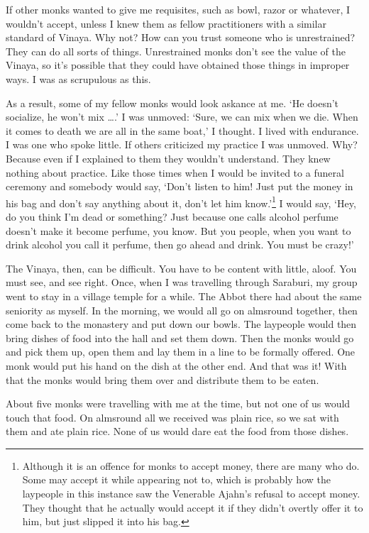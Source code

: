 If other monks wanted to give me requisites, such as bowl, razor or whatever, I wouldn't accept, unless I knew them as fellow practitioners with a similar standard of Vinaya. Why not? How can you trust someone who is unrestrained? They can do all sorts of things. Unrestrained monks don't see the value of the Vinaya, so it's possible that they could have obtained those things in improper ways. I was as scrupulous as this. 

As a result, some of my fellow monks would look askance at me. `He doesn't socialize, he won't mix \ldots{}.' I was unmoved: `Sure, we can mix when we die. When it comes to death we are all in the same boat,' I thought. I lived with endurance. I was one who spoke little. If others criticized my practice I was unmoved. Why? Because even if I explained to them they wouldn't understand. They knew nothing about practice. Like those times when I would be invited to a funeral ceremony and somebody would say, `Don't listen to him! Just put the money in his bag and don't say anything about it, don't let him know.'\footnote{Although it is an offence for monks to accept money, there are many who do. Some may accept it while appearing not to, which is probably how the laypeople in this instance saw the Venerable Ajahn's refusal to accept money. They thought that he actually would accept it if they didn't overtly offer it to him, but just slipped it into his bag.} I would say, `Hey, do you think I'm dead or something? Just because one calls alcohol perfume doesn't make it become perfume, you know. But you people, when you want to drink alcohol you call it perfume, then go ahead and drink. You must be crazy!' 

The Vinaya, then, can be difficult. You have to be content with little, aloof. You must see, and see right. Once, when I was travelling through Saraburi, my group went to stay in a village temple for a while. The Abbot there had about the same seniority as myself. In the morning, we would all go on almsround together, then come back to the monastery and put down our bowls. The laypeople would then bring dishes of food into the hall and set them down. Then the monks would go and pick them up, open them and lay them in a line to be formally offered. One monk would put his hand on the dish at the other end. And that was it! With that the monks would bring them over and distribute them to be eaten. 

About five monks were travelling with me at the time, but not one of us would touch that food. On almsround all we received was plain rice, so we sat with them and ate plain rice. None of us would dare eat the food from those dishes. 


